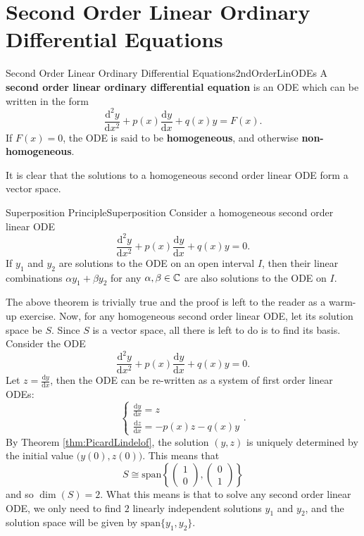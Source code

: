 \documentclass[math, code]{amznotes}
\theoremstyle{remark}
\renewcommand{\d}{\mathrm{d}}
\begin{document}
\section{Second Order Linear Ordinary Differential Equations}
\begin{dfnbox}{Second Order Linear Ordinary Differential Equations}{2ndOrderLinODEs}
    A {\color{red} \textbf{second order linear ordinary differential equation}} is an ODE which can be written in the form 
    \begin{equation*}
        \frac{\d^2y}{\d x^2} + p(x)\frac{\d y}{\d x} + q(x)y = F(x).
    \end{equation*}
    If $F(x) = 0$, the ODE is said to be {\color{red} \textbf{homogeneous}}, and otherwise {\color{red} \textbf{non-homogeneous}}. 
\end{dfnbox}
It is clear that the solutions to a homogeneous second order linear ODE form a vector space.
\begin{thmbox}{Superposition Principle}{Superposition}
    Consider a homogeneous second order linear ODE 
    \begin{equation*}
        \frac{\d^2y}{\d x^2} + p(x)\frac{\d y}{\d x} + q(x)y = 0.
    \end{equation*}
    If $y_1$ and $y_2$ are solutions to the ODE on an open interval $I$, then their linear combinations $\alpha y_1 + \beta y_2$ for any $\alpha, \beta \in \mathbb{C}$ are also solutions to the ODE on $I$.
\end{thmbox}
The above theorem is trivially true and the proof is left to the reader as a warm-up exercise. Now, for any homogeneous second order linear ODE, let its solution space be $S$. Since $S$ is a vector space, all there is left to do is to find its basis. Consider the ODE 
\begin{equation*}
    \frac{\d^2y}{\d x^2} + p(x)\frac{\d y}{\d x} + q(x)y = 0.
\end{equation*}
Let $z = \frac{\d y}{\d x}$, then the ODE can be re-written as a system of first order linear ODEs:
\begin{equation*}
    \begin{cases}
        \frac{\d y}{\d x} = z \\
        \frac{\d z}{\d x} = -p(x)z - q(x)y
    \end{cases}.
\end{equation*}
By Theorem \ref{thm:PicardLindelof}, the solution $(y, z)$ is uniquely determined by the initial value $\bigl(y(0), z(0)\bigr)$. This means that 
\begin{equation*}
    S \cong \mathrm{span}\left\{\begin{pmatrix}
        1 \\
        0
    \end{pmatrix}, \begin{pmatrix}
        0 \\
        1
    \end{pmatrix}\right\}
\end{equation*}
and so $\dim(S) = 2$. What this means is that to solve any second order linear ODE, we only need to find $2$ linearly independent solutions $y_1$ and $y_2$, and the solution space will be given by $\mathrm{span}\{y_1, y_2\}$.
\end{document}
